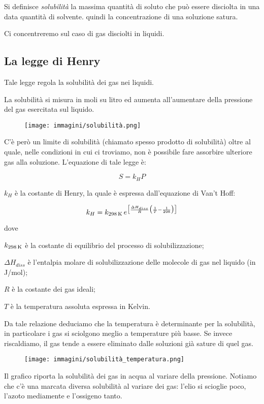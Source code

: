 Si definisce \textit{solubilità} la massima quantità di soluto che può essere disciolta in una data quantità di
solvente. \E quindi la concentrazione di una soluzione satura.

Ci concentreremo sul caso di gas disciolti in liquidi.
\subsection{La legge di Henry}
Tale legge regola la solubilità dei gas nei liquidi.

La solubilità si misura in moli su litro ed aumenta all'aumentare della pressione del gas esercitata sul liquido.
\begin{figure}[htp]
    \centering
    \texttt{[image: immagini/solubilità.png]}
\end{figure}

C'è però un limite di solubilità (chiamato spesso prodotto di solubilità) oltre al quale, nelle condizioni in cui ci troviamo, non è possibile fare assorbire ulteriore gas alla soluzione.
L'equazione di tale legge è:

$$S=k_HP$$

$k_H$ è la costante di Henry, la quale è espressa dall'equazione di Van't Hoff:

$$k_H=k_{298 \, \rm K} \, e^{\big[\frac{\Delta H_{diss}}{R} \big( \frac{1}{T} - \frac{1}{298} \big) \big]}$$

dove

$k_{298 \, \rm K}$ è la costante di equilibrio del processo di solubilizzazione;

$\Delta H_{diss}$ è l'entalpia molare di solubilizzazione delle molecole di gas nel liquido (in J/mol);

$R$ è la costante dei gas ideali;

$T$ è la temperatura assoluta espressa in Kelvin.

Da tale relazione deduciamo che la temperatura è determinante per la solubilità, in particolare i gas si sciolgono meglio a temperature più basse. Se invece riscaldiamo, il gas tende a essere eliminato dalle soluzioni già sature di quel gas.

\begin{minipage}{0.5 \textwidth}
    \begin{figure}[H]
        \centering
        \texttt{[image: immagini/solubilità\_temperatura.png]}
    \end{figure}
\end{minipage}
\begin{minipage}{0.4 \textwidth}
    \vspace{0.8cm}Il grafico riporta la solubilità dei gas in acqua al variare della pressione. Notiamo che c'è una marcata diversa solubilità al variare dei gas: l'elio si scioglie poco, l'azoto mediamente e l'ossigeno tanto.
\end{minipage}

